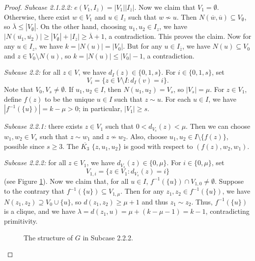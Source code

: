 \documentclass{article}
\newcommand\sm{\setminus}
\theoremstyle{definition}
\begin{document}
\begin{proof}
    \textit{Subcase 2.1.2.2:} $e(V_1,I_{\overline z})=|V_1||I_{\overline z}|$. Now we claim that $V_1=\emptyset$. Otherwise, there exist $w\in V_1$ and $u\in I_z$ such that $w\not\sim u$. Then $N(\overline w,\overline u)\subseteq V_\emptyset$, so $\overline\lambda\le|V_{\emptyset}|$. On the other hand, choosing $u_1,u_2\in I_z$, we have $|N(\overline{u_1},\overline{u_2})|\ge|V_{\emptyset}|+|I_{\overline z}|\ge\overline\lambda+1$, a contradiction. This proves the claim. Now for any $u\in I_z$, we have $k=|N(u)|=|V_0|$. But for any $u\in I_{\overline z}$, we have $N(u)\subseteq V_0$ and $z\in V_0\sm N(u)$, so $k=|N(u)|\le|V_0|-1$, a contradiction.

    \textit{Subcase 2.2:} for all $z\in V$, we have $d_I(z)\in \{0,1,s\}$. For $i\in\{0,1,s\}$, set
    $$V_i=\{z\in V\sm I:d_I(v)=i\}.$$
    Note that $V_0,V_s\ne\emptyset$. If $u_1,u_2\in I$, then $N(u_1,u_2)=V_s$, so $|V_s|=\mu$. For $z\in V_1$, define $f(z)$ to be the unique $u\in I$ such that $z\sim u$. For each $u\in I$, we have $|f^{-1}(\{u\})|=k-\mu>0$; in particular, $|V_1|\ge s$.

    \textit{Subcase 2.2.1:} there exists $z\in V_1$ such that $0<d_{V_s}(z)<\mu$. Then we can choose $w_1,w_2\in V_s$ such that $z\sim w_1$ and $z\not\sim w_2$. Also, choose $u_1,u_2\in I\sm\{f(z)\}$, possible since $s\ge 3$. The $\overline{K_3}$ $\{z,u_1,u_2\}$ is good with respect to $(f(z),w_2,w_1)$.

    \textit{Subcase 2.2.2:} for all $z\in V_1$, we have $d_{V_s}(z)\in\{0,\mu\}$. For $i\in\{0,\mu\}$, set
    $$V_{1,i}=\{z\in V_1:d_{V_s}(z)=i\}$$
    (see Figure \ref{Figure Subcase 2.2.2}). Now we claim that, for all $u\in I$, $f^{-1}(\{u\})\cap V_{1,0}\ne\emptyset$. Suppose to the contrary that $f^{-1}(\{u\})\subseteq V_{1,\mu}$. Then for any $z_1,z_2\in f^{-1}(\{u\})$, we have $N(z_1,z_2)\supseteq V_0\cup\{u\}$, so $d(z_1,z_2)\ge\mu+1$ and thus $z_1\sim z_2$. Thus, $f^{-1}(\{u\})$ is a clique, and we have $\lambda=d(z_1,u)=\mu+(k-\mu-1)=k-1$, contradicting primitivity.

\begin{figure}
        \begin{center}
\end{center}
\caption{The structure of $G$ in Subcase 2.2.2.} \label{Figure Subcase 2.2.2}
\end{figure}


\end{proof}
\end{document}

